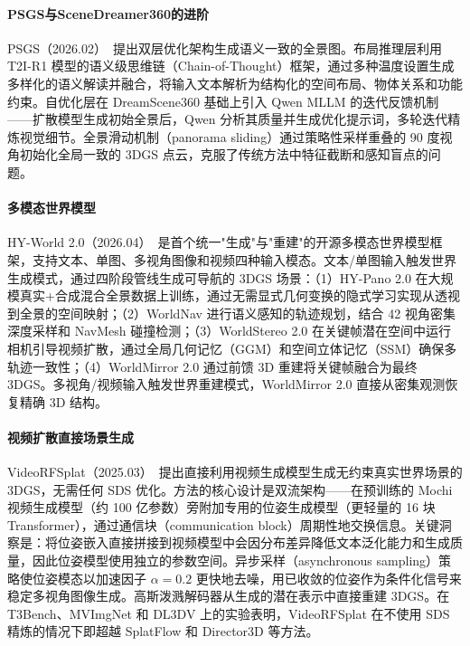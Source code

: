 \paragraph{PSGS与SceneDreamer360的进阶}

PSGS（2026.02）~\cite{2602_00463}提出双层优化架构生成语义一致的全景图。布局推理层利用 T2I-R1 模型的语义级思维链（Chain-of-Thought）框架，通过多种温度设置生成多样化的语义解读并融合，将输入文本解析为结构化的空间布局、物体关系和功能约束。自优化层在 DreamScene360 基础上引入 Qwen MLLM 的迭代反馈机制——扩散模型生成初始全景后，Qwen 分析其质量并生成优化提示词，多轮迭代精炼视觉细节。全景滑动机制（panorama sliding）通过策略性采样重叠的 90 度视角初始化全局一致的 3DGS 点云，克服了传统方法中特征截断和感知盲点的问题。

\paragraph{多模态世界模型}

HY-World 2.0（2026.04）~\cite{2604_14268}是首个统一"生成"与"重建"的开源多模态世界模型框架，支持文本、单图、多视角图像和视频四种输入模态。文本/单图输入触发世界生成模式，通过四阶段管线生成可导航的 3DGS 场景：（1）HY-Pano 2.0 在大规模真实+合成混合全景数据上训练，通过无需显式几何变换的隐式学习实现从透视到全景的空间映射；（2）WorldNav 进行语义感知的轨迹规划，结合 42 视角密集深度采样和 NavMesh 碰撞检测；（3）WorldStereo 2.0 在关键帧潜在空间中运行相机引导视频扩散，通过全局几何记忆（GGM）和空间立体记忆（SSM）确保多轨迹一致性；（4）WorldMirror 2.0 通过前馈 3D 重建将关键帧融合为最终 3DGS。多视角/视频输入触发世界重建模式，WorldMirror 2.0 直接从密集观测恢复精确 3D 结构。

\paragraph{视频扩散直接场景生成}

VideoRFSplat（2025.03）~\cite{2503_15855}提出直接利用视频生成模型生成无约束真实世界场景的 3DGS，无需任何 SDS 优化。方法的核心设计是双流架构——在预训练的 Mochi 视频生成模型（约 100 亿参数）旁附加专用的位姿生成模型（更轻量的 16 块 Transformer），通过通信块（communication block）周期性地交换信息。关键洞察是：将位姿嵌入直接拼接到视频模型中会因分布差异降低文本泛化能力和生成质量，因此位姿模型使用独立的参数空间。异步采样（asynchronous sampling）策略使位姿模态以加速因子 $\alpha=0.2$ 更快地去噪，用已收敛的位姿作为条件化信号来稳定多视角图像生成。高斯泼溅解码器从生成的潜在表示中直接重建 3DGS。在 T3Bench、MVImgNet 和 DL3DV 上的实验表明，VideoRFSplat 在不使用 SDS 精炼的情况下即超越 SplatFlow 和 Director3D 等方法。

